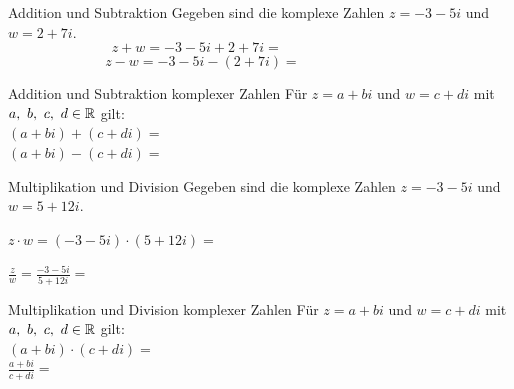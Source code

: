 \begin{bsp}{Addition und Subtraktion}{}
     Gegeben sind die komplexe Zahlen $z=-3-5i$ und $w=2+7i$.
$$z+w=-3-5i+2+7i=\phantom{fdjskaljfkdsljfkslkl}$$
	\vfill
    $$z-w=-3-5i-(2+7i)=\phantom{fdjskaljfkdsljfksl}$$
    \vfill

\end{bsp}

\begin{satz}{Addition und Subtraktion komplexer Zahlen}{}
Für $z=a + bi$ und $w=c + di$ mit $a,\ b,\ c,\ d\in \mathbb{R}$ gilt:\\

$\displaystyle{(a + bi) + (c + di) =}$ \\

$\displaystyle{(a + bi) - (c + di) =}$


\end{satz}

\begin{bsp}{Multiplikation und Division}{}
    Gegeben sind die komplexe Zahlen $z=-3-5i$ und $w=5+12i$. 

    \bigskip

$z\cdot w=(-3-5i)\cdot (5+12i)=\phantom{fdjskaljfkdsljfkslkl}$

   \vspace*{2cm}

   $\frac{z}{w}=\frac{-3-5i}{5+12i}=\phantom{fdjskaljfkdsljfksl}$
   \vspace*{3cm}

\end{bsp}

\begin{satz}
    {Multiplikation und Division komplexer Zahlen}{}
    Für $z=a + bi$ und $w=c + di$ mit $a,\ b,\ c,\ d\in \mathbb{R}$ gilt:\\

    $\displaystyle{(a + bi) \cdot (c + di) =}$\\
    
    $\displaystyle{\frac{a+bi}{c+di} =}$
\end{satz}


